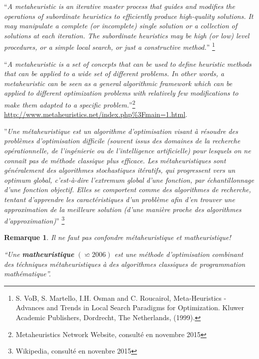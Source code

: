 \documentclass[a4paper,11pt,oneside]{report}
\newtheorem{remarque}{Remarque}[section]
\theoremstyle{plain}
\newcommand{\0}{/ \! \! \! 0}
\theoremstyle{plain}
\begin{document}
 
  ``{\it A metaheuristic is an iterative master process that guides and modifies the operations of subordinate heuristics to efficiently produce
  high-quality solutions. It may manipulate a complete (or incomplete) single solution or a collection of solutions at each iteration. The
  subordinate heuristics may be high (or low) level procedures, or a simple local search, or just a constructive method.}'' \footnote{S. VoB, S. Martello, 
  I.H. Osman and C. Roucairol, Meta-Heuristics - Advances and Trends in Local Search Paradigms for Optimization. Kluwer Academic Publishers, 
  Dordrecht, The Netherlands, (1999).}\vspace{0.5cm}
  
  
  ``{\it A metaheuristic is a set of concepts that can be used to define heuristic methods that can be applied to a wide set of different problems.
  In other words, a metaheuristic can be seen as a general algorithmic framework which can be applied to different optimization problems with
  relatively few modifications to make them adapted to a specific problem.}''\footnote{Metaheuristics Network Website, consult\'e en novembre 2015}
  \url{http://www.metaheuristics.net/index.php\%3Fmain=1.html}. \vspace{0.5cm}
  
  ''{\it Une m\'etaheuristique est un algorithme d'optimisation visant \`a r\'esoudre des probl\`emes d'optimisation difficile (souvent issus des domaines
  de la recherche op\'erationnelle, de l'ing\'enierie ou de l'intelligence artificielle) pour lesquels on ne conna\^it pas de m\'ethode classique plus
  efficace. Les m\'etaheuristiques sont g\'en\'eralement des algorithmes stochastiques it\'eratifs, qui progressent vers un optimum global,
  c'est-\`a-dire l'extremum global d'une fonction, par \'echantillonnage d'une fonction objectif. Elles se comportent comme des algorithmes de recherche,
  tentant d'apprendre les caract\'eristiques d'un probl\`eme afin d'en trouver une approximation de la meilleure solution (d'une mani\`ere proche
  des algorithmes d'approximation)}''  \footnote{Wikipedia, consult\'e en novenbre 2015}
  \begin{remarque}
   Il ne faut pas confondre m\'etaheuristique et matheuristique!
   
   ``Une {\bf {\it matheuristique}} $(\backsimeq 2006)$ est une m\'ethode d'optimisation combinant des t\'echniques m\'etaheuristiques \`a des algorithmes 
   classiques de programmation math\'ematique''.
  \end{remarque}
\end{document}
